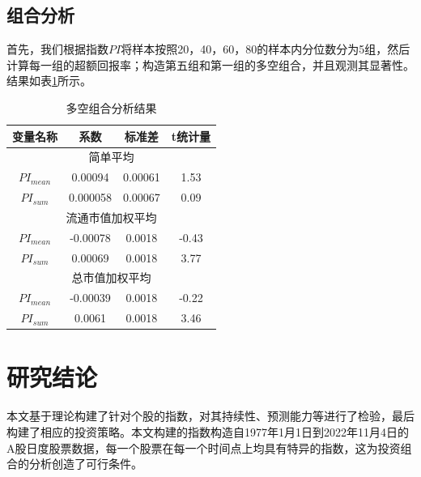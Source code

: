 \documentclass[a4paper,12pt]{report}
\begin{document}
\section{组合分析}
首先，我们根据指数$PI$将样本按照20，40，60，80的样本内分位数分为5组，然后计算每一组的超额回报率；构造第五组和第一组的多空组合，并且观测其显著性。结果如表\ref{portfolio analysis}所示。


\begin{table}[htbp]
	\caption{多空组合分析结果}
	\label{portfolio analysis}
	\centering
	\begin{tabular}{@{}cccc@{}}
		\toprule
		变量名称          & 系数    & 标准差   & t统计量  \\ \midrule
		\multicolumn{4}{c}{简单平均}         \\ \midrule
		$PI_{mean}$     & 0.00094  &0.00061 & 1.53  \\
		$PI_{sum}$      & 0.000058 &0.00067& 0.09  \\ \midrule
		\multicolumn{4}{c}{流通市值加权平均}     \\ \midrule
		$PI_{mean}$ & -0.00078  &0.0018& -0.43 \\
		$PI_{sum}$  & 0.00069   &0.0018& 3.77  \\ \midrule
		\multicolumn{4}{c}{总市值加权平均}      \\ \midrule
		$PI_{mean}$   & -0.00039  &0.0018& -0.22 \\
		$PI_{sum}$  & 0.0061  &0.0018& 3.46  \\ \bottomrule
	\end{tabular}
\end{table}

\chapter{研究结论}
本文基于理论构建了针对个股的指数，对其持续性、预测能力等进行了检验，最后构建了相应的投资策略。本文构建的指数构造自1977年1月1日到2022年11月4日的A股日度股票数据，每一个股票在每一个时间点上均具有特异的指数，这为投资组合的分析创造了可行条件。


\nocite{*}
{\color{black} \printbibliography}
\end{document}
